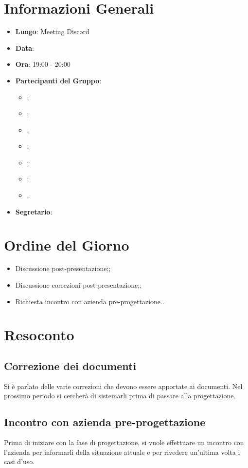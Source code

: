 \section{Informazioni Generali}

\begin{itemize}
\item{\textbf{Luogo}}: Meeting Discord
\item{\textbf{Data}}: \D
\item{\textbf{Ora}}: 19:00 - 20:00
\item{\textbf{Partecipanti del Gruppo}}: 
	\begin{itemize}
	\item{\EP{};} 
	\item{\FP{};}
	\item{\GC{};}
	\item{\LW{};}
	\item{\MB{};}
	\item{\MG{};}
	\item{\PV{}.}
	\end{itemize} 
\item{\textbf{Segretario}}: \PV{}	
\end{itemize}

\section{Ordine del Giorno}
\begin{itemize}
\item{Discussione post-presentazione;};
\item{Discussione correzioni post-presentazione;};
\item{Richiesta incontro con azienda pre-progettazione.}.
\end{itemize}

\section{Resoconto}
 
\subsection{Correzione dei documenti} 
Si è parlato delle varie correzioni che devono essere apportate ai documenti. Nel prossimo periodo si cercherà di sistemarli prima di passare alla progettazione.
 
\subsection{Incontro con azienda pre-progettazione}
Prima di iniziare con la fase di progettazione, si vuole effettuare un incontro con l'azienda per informarli della situazione attuale e per rivedere un'ultima volta i casi d'uso.
